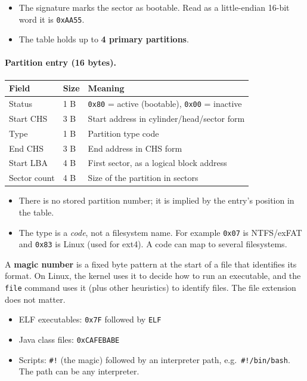 \documentclass{article}
\begin{document}
\begin{itemize}
	\item The signature marks the sector as bootable. Read as a little-endian 16-bit word it is \texttt{0xAA55}.
	\item The table holds up to \textbf{4 primary partitions}.
\end{itemize}

\paragraph{Partition entry (16 bytes).}
\begin{table}[H]
	\centering
	\begin{tabular}{lll}
		\toprule
		\textbf{Field} & \textbf{Size} & \textbf{Meaning} \\
		\midrule
		Status & 1 B & \texttt{0x80} = active (bootable), \texttt{0x00} = inactive \\
		Start CHS & 3 B & Start address in cylinder/head/sector form \\
		Type & 1 B & Partition type code \\
		End CHS & 3 B & End address in CHS form \\
		Start LBA & 4 B & First sector, as a logical block address \\
		Sector count & 4 B & Size of the partition in sectors \\
		\bottomrule
	\end{tabular}
\end{table}
\begin{itemize}
	\item There is no stored partition number; it is implied by the entry's position in the table.
	\item The type is a \emph{code}, not a filesystem name. For example \texttt{0x07} is NTFS/exFAT and \texttt{0x83} is Linux (used for ext4). A code can map to several filesystems.
\end{itemize}

\begin{extra}
	A \textbf{magic number} is a fixed byte pattern at the start of a file that identifies its format. On Linux, the kernel uses it to decide how to run an executable, and the \texttt{file} command uses it (plus other heuristics) to identify files. The file extension does not matter.
	\begin{itemize}
		\item ELF executables: \texttt{0x7F} followed by \texttt{ELF}
		\item Java class files: \texttt{0xCAFEBABE}
		\item Scripts: \texttt{\#!} (the magic) followed by an interpreter path, e.g.\ \texttt{\#!/bin/bash}. The path can be any interpreter.
	\end{itemize}
\end{extra}
\end{document}
